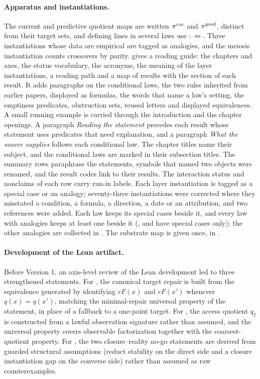 \paragraph{Apparatus and instantiations.} The current and predictive quotient maps are written \(\pi^{\mathrm{cur}}\) and \(\pi^{\mathrm{pred}}\), distinct from their target sets, and defining lines in several laws use \(:\Longleftrightarrow\). Three instantiations whose data are
empirical are tagged as analogies, and the meiosis instantiation counts
crossovers by parity.
 gives a reading guide: the chapters and axes, the status
vocabulary, the acronyms, the meaning of the layer instantiations, a reading
path and a map of results with the section of each result. It adds paragraphs
on the conditional laws, the two rules inherited from earlier papers,
displayed as formulas, the words that name a law's setting, the emptiness
predicates, obstruction sets, reused letters and displayed equivalences. A
small running example is carried through the introduction and the chapter
openings. A paragraph \emph{Reading the statement} precedes each result whose
statement uses predicates that need explanation, and a paragraph \emph{What the
source supplies} follows each conditional law. The chapter titles name their
subject, and the conditional laws are marked in their subsection titles. The
summary rows paraphrase the statements, symbols that named two objects were
renamed, and the result codes link to their results. The interaction status
and nonclaims of each row carry run-in labels. Each layer instantiation is
tagged as a special case or an analogy; seventy-three instantiations were
corrected where they misstated a condition, a formula, a direction, a date or
an attribution, and two references were added. Each law keeps its special cases beside it, and every law with analogies keeps at least one beside it (,  and  have special cases only); the other analogies are collected in
. The substrate map is given once, in
.

\paragraph{Development of the Lean artifact.}
Before Version 1, an axis-level review of the Lean development led to three
strengthened statements. For , the canonical target repair is built
from the equivalence generated by identifying \(rF(x)\) and \(rF(x')\)
whenever \(q(x)=q(x')\), matching the minimal-repair universal property of
the statement, in place of a fallback to a one-point target. For ,
the access quotient \(q_I\) is constructed from a lawful observation
signature rather than assumed, and the universal property covers observable
factorization together with the coarsest-quotient property. For ,
the two closure--reality no-go statements are derived from guarded
structural assumptions (reduct stability on the direct side and a closure
instantiation gap on the converse side) rather than assumed as raw
counterexamples.


